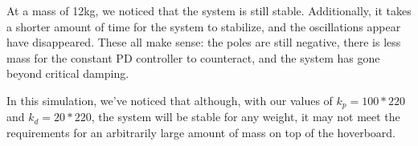 \documentclass[titlepage]{article}
\begin{document}
At a mass of 12kg, we noticed that the system is still stable. Additionally, it takes a shorter amount of time for the system to stabilize, and the oscillations appear have disappeared. These all make sense: the poles are still negative, there is less mass for the constant PD controller to counteract, and the system has gone beyond critical damping.

In this simulation, we've noticed that although, with our values of $k_p = 100*220$ and $k_d = 20*220$, the system will be stable for any weight, it may not meet the requirements for an arbitrarily large amount of mass on top of the hoverboard.
\end{document}
